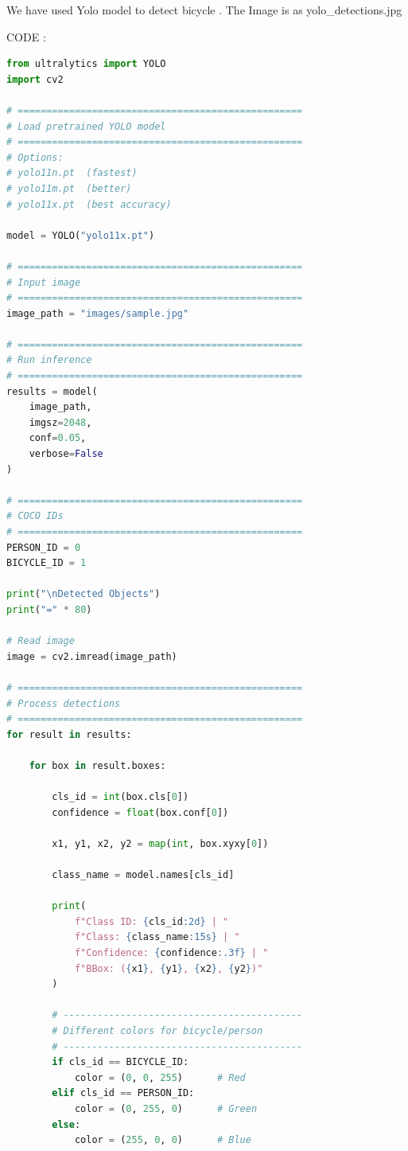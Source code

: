 \documentclass[12pt,a4paper]{article}
\newenvironment{studentSpace}{\par\medskip\noindent}{\par\bigskip}
\begin{document}
\begin{studentSpace}
We have used Yolo model to detect bicycle . The Image is as yolo_detections.jpg


CODE :

\begin{lstlisting}[language=Python]
from ultralytics import YOLO
import cv2

# ==================================================
# Load pretrained YOLO model
# ==================================================
# Options:
# yolo11n.pt  (fastest)
# yolo11m.pt  (better)
# yolo11x.pt  (best accuracy)

model = YOLO("yolo11x.pt")

# ==================================================
# Input image
# ==================================================
image_path = "images/sample.jpg"

# ==================================================
# Run inference
# ==================================================
results = model(
    image_path,
    imgsz=2048,
    conf=0.05,
    verbose=False
)

# ==================================================
# COCO IDs
# ==================================================
PERSON_ID = 0
BICYCLE_ID = 1

print("\nDetected Objects")
print("=" * 80)

# Read image
image = cv2.imread(image_path)

# ==================================================
# Process detections
# ==================================================
for result in results:

    for box in result.boxes:

        cls_id = int(box.cls[0])
        confidence = float(box.conf[0])

        x1, y1, x2, y2 = map(int, box.xyxy[0])

        class_name = model.names[cls_id]

        print(
            f"Class ID: {cls_id:2d} | "
            f"Class: {class_name:15s} | "
            f"Confidence: {confidence:.3f} | "
            f"BBox: ({x1}, {y1}, {x2}, {y2})"
        )

        # ------------------------------------------
        # Different colors for bicycle/person
        # ------------------------------------------
        if cls_id == BICYCLE_ID:
            color = (0, 0, 255)      # Red
        elif cls_id == PERSON_ID:
            color = (0, 255, 0)      # Green
        else:
            color = (255, 0, 0)      # Blue


\end{lstlisting}
\end{studentSpace}
\end{document}
